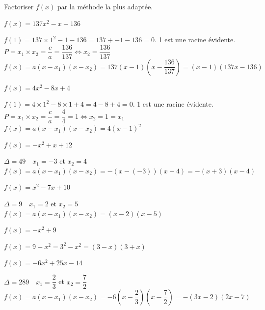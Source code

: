 \documentclass[11pt,a4paper]{article}  %
\begin{document}
Factoriser $f(x)$ par la méthode la plus adaptée.
	\begin{enumMet}
		\item $f(x)=137 x^2-x-136$
		\begin{corrBox}
			$f(1)=137\times1^2-1-136=137+-1-136=0$. 1 est une racine évidente.\\
			$P=x_1\times x_2=\dfrac{c}{a}=\dfrac{136}{137}\iff x_2=\dfrac{136}{137}$\\
			$f(x)=a(x-x_1)(x-x_2)=137(x-1)\left(x-\dfrac{136}{137}\right)=(x-1)(137x-136)$
		\end{corrBox}
		\item $f(x)=4 x^2-8 x+4$
		\begin{corrBox}
			$f(1)=4\times1^2-8\times1+4=4-8+4=0$. 1 est une racine évidente.\\
			$P=x_1\times x_2=\dfrac{c}{a}=\dfrac{4}{4}=1\iff x_2=1=x_1$\\
			$f(x)=a(x-x_1)(x-x_2)=4(x-1)^2$
		\end{corrBox}
		\item $f(x)=-x^2+x+12$
		\begin{corrBox}
			$\Delta=49\quad x_1=-3$ et $x_2=4$\\
			$f(x)=a(x-x_1)(x-x_2)=-(x-(-3))(x-4)=-(x+3)(x-4)$
		\end{corrBox}
		\item $f(x)=x^2-7 x+10$
		\begin{corrBox}
			$\Delta=9\quad x_1=2$ et $x_2=5$\\
			$f(x)=a(x-x_1)(x-x_2)=(x-2)(x-5)$
		\end{corrBox}
		\item $f(x)=-x^2+9$
		\begin{corrBox}
			$f(x)=9-x^2=3^2-x^2=(3-x)(3+x)$
		\end{corrBox}
		\item $f(x)=-6 x^2+25 x-14$
		\begin{corrBox}
			$\Delta=289\quad x_1=\dfrac{2}{3}$ et $x_2=\dfrac{7}{2}$\\
			$f(x)=a(x-x_1)(x-x_2)=-6\left(x-\dfrac{2}{3}\right)\left(x-\dfrac{7}{2}\right)=-(3x-2)(2x-7)$
		\end{corrBox}
	\end{enumMet}
\end{document}
